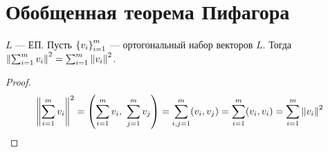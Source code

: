 \section{Обобщенная теорема Пифагора}

\begin{thm*}
    $L$ --- ЕП. Пусть $\left\{v_i\right\}_{i=1}^{m}$ --- ортогональный набор векторов $L$. Тогда $\left\lVert\sum_{i=1}^m v_i\right\rVert^2 = \sum_{i=1}^m \left\lVert v_i\right\rVert^2$.
\end{thm*}

\begin{proof}
    $${\left\lVert\sum_{i=1}^m v_i\right\rVert}^2 = \left(\sum_{i=1}^m v_i,\ \sum_{j=1}^m v_j\right) = \sum_{i,j=1}^m (v_i, v_j) = \sum_{i=1}^m (v_i, v_i) = \sum_{i=1}^m \left\lVert v_i\right\rVert^2$$
\end{proof}